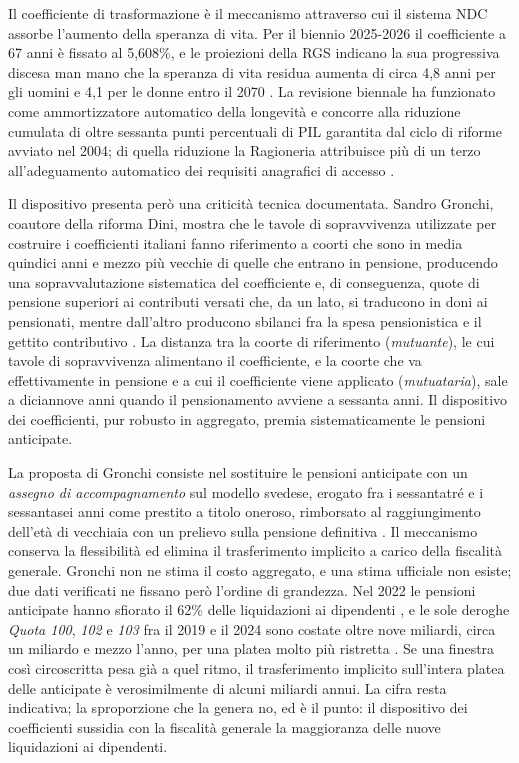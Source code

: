 \noindent
Il coefficiente di trasformazione è il meccanismo attraverso cui il sistema
NDC assorbe l'aumento della speranza di vita. Per il biennio 2025-2026 il
coefficiente a 67 anni è fissato al 5,608\%, e le proiezioni della RGS
indicano la sua progressiva discesa man mano che la speranza di vita residua
aumenta di circa 4,8 anni per gli uomini e 4,1 per le donne entro il 2070
\cite{MEF_RGS2025}. La revisione biennale ha funzionato come ammortizzatore
automatico della longevità e concorre alla riduzione cumulata di oltre
sessanta punti percentuali di PIL garantita dal ciclo di riforme avviato nel
2004; di quella riduzione la Ragioneria attribuisce più di un terzo
all'adeguamento automatico dei requisiti anagrafici di accesso \cite{MEF_RGS2025_NdA}.

\medskip
\noindent
Il dispositivo presenta però una criticità tecnica documentata. Sandro
Gronchi, coautore della riforma Dini, mostra che le tavole di sopravvivenza
utilizzate per costruire i coefficienti italiani fanno riferimento a coorti
che sono in media quindici anni e mezzo più vecchie di quelle che entrano in
pensione, producendo una sopravvalutazione sistematica del coefficiente e, di
conseguenza, \guillemotleft{}quote di pensione superiori ai contributi versati che, da un
lato, si traducono in doni ai pensionati, mentre dall'altro producono sbilanci
fra la spesa pensionistica e il gettito contributivo \guillemotright{}\cite{Gronchi2024}.
La distanza tra la coorte di riferimento (\emph{mutuante}), le cui tavole di
sopravvivenza alimentano il coefficiente, e la coorte che va effettivamente in
pensione e a cui il coefficiente viene applicato (\emph{mutuataria}), sale a
diciannove anni quando il pensionamento avviene a sessanta anni. Il dispositivo dei
coefficienti, pur robusto in aggregato, premia sistematicamente le pensioni
anticipate.

\medskip
\noindent
La proposta di Gronchi consiste nel sostituire le pensioni anticipate con un
\emph{assegno di accompagnamento} sul modello svedese, erogato fra i
sessantatré e i sessantasei anni come prestito a titolo oneroso, rimborsato
al raggiungimento dell'età di vecchiaia con un prelievo sulla pensione
definitiva \cite{Gronchi2024}. Il meccanismo conserva la flessibilità ed
elimina il trasferimento implicito a carico della fiscalità generale. Gronchi
non ne stima il costo aggregato, e una stima ufficiale non esiste; due dati
verificati ne fissano però l'ordine di grandezza. Nel 2022 le pensioni anticipate
hanno sfiorato il 62\% delle liquidazioni ai dipendenti \cite{Gronchi2024}, e le
sole deroghe \emph{Quota 100}, \emph{102} e \emph{103} fra il 2019 e il 2024 sono
costate oltre nove miliardi, circa un miliardo e mezzo l'anno, per una platea molto
più ristretta \cite{MEF_RGS2025_NdA}. Se una finestra così circoscritta pesa già a
quel ritmo, il trasferimento implicito sull'intera platea delle anticipate è
verosimilmente di alcuni miliardi annui. La cifra resta indicativa; la sproporzione
che la genera no, ed è il punto: il dispositivo dei coefficienti sussidia con la
fiscalità generale la maggioranza delle nuove liquidazioni ai dipendenti.

